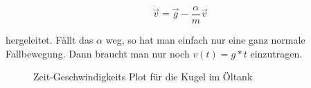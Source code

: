 \begin{equation*}
\dot{\vec{v}} = \vec{g} - \frac{\alpha}{m} \vec{v}
\end{equation*}

hergeleitet. Fällt das $\alpha$ weg, so hat man einfach nur eine ganz normale Fallbewegung. Dann braucht man nur noch $v(t) = g*t$ einzutragen.

\begin{figure}[h]
\begin{center}
\caption{Zeit-Geschwindigkeits Plot für die Kugel im Öltank}
\end{center}
\end{figure}

